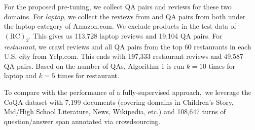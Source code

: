 \begin{table}[H]
    \caption{Statistics of $(\text{RC})_2$ Datasets.}
    \centering
\label{chap6:tbl:rcrc}
\vspace{-5mm}
\end{table}

For the proposed pre-tuning, we collect QA pairs and reviews for these two domains.
For \emph{laptop}, we collect the reviews from \cite{he2016ups} and QA pairs from \cite{Xu2018pro} both under the laptop category of Amazon.com. We exclude products in the test data of $(\text{RC})_2$.
This gives us 113,728 laptop reviews and 19,104 QA pairs. 
For \emph{restaurant}, we crawl reviews and all QA pairs from the top 60 restaurants in each U.S. city from Yelp.com.
This ends with 197,333 restaurant reviews and 49,587 QA pairs. Based on the number of QAs, Algorithm 1 is run $k=10$ times for laptop and $k=5$ times for restaurant.

To compare with the performance of a fully-supervised approach,~we leverage the CoQA dataset with 7,199 documents (covering domains in Children’s Story, Mid/High School Literature, News, Wikipedia, etc.) and 108,647 turns of question/answer span annotated via crowdsourcing.

